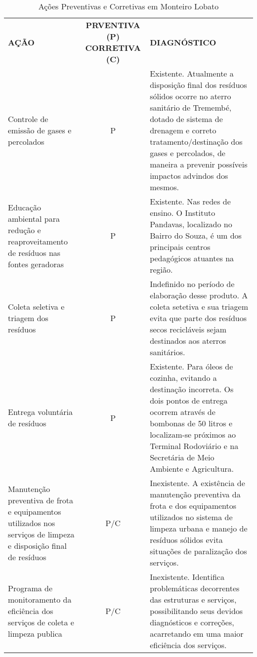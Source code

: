\begin{table}[htbp]
	\centering
	\caption{Ações Preventivas e Corretivas em Monteiro Lobato}
	\begin{tabular}{p{23.455em}cp{27.725em}}
		\rowcolor[rgb]{ .969,  .588,  .275} \textcolor[rgb]{ 1,  1,  1}{\textbf{AÇÃO}} & \multicolumn{1}{p{7.91em}}{\textcolor[rgb]{ 1,  1,  1}{\textbf{PRVENTIVA (P) CORRETIVA (C)}}} & \textcolor[rgb]{ 1,  1,  1}{\textbf{DIAGNÓSTICO}} \\
		\rowcolor[rgb]{ .984,  .831,  .706} Controle de emissão de gases e percolados & P     & Existente. Atualmente a disposição final dos resíduos sólidos ocorre no aterro sanitário de Tremembé, dotado de sistema de drenagem e correto tratamento/destinação dos gases e percolados, de maneira a prevenir possíveis impactos advindos dos mesmos. \\
		\rowcolor[rgb]{ .992,  .914,  .851} Educação ambiental para redução e reaproveitamento de resíduos nas fontes geradoras & P     & Existente. Nas redes de ensino. O Instituto Pandavas, localizado no Bairro do Souza, é um dos principais centros pedagógicos atuantes na região. \\
		\rowcolor[rgb]{ .984,  .831,  .706} Coleta seletiva e triagem dos resíduos & P     & Indefinido no período de elaboração desse produto. A coleta setetiva e sua triagem evita que parte dos resíduos secos recicláveis sejam destinados aos aterros sanitários. \\
		\rowcolor[rgb]{ .992,  .914,  .851} Entrega voluntária de resíduos & P     & Existente. Para óleos de cozinha, evitando a destinação incorreta. Os dois pontos de entrega ocorrem através de bombonas de 50 litros e localizam-se próximos ao Terminal Rodoviário e na Secretária de Meio Ambiente e Agricultura. \\
		\rowcolor[rgb]{ .984,  .831,  .706} Manutenção preventiva de frota e equipamentos utilizados nos serviços de limpeza e disposição final de resíduos & \multicolumn{1}{p{7.91em}}{P/C} & Inexistente. A existência de manutenção preventiva da frota e dos equipamentos utilizados no sistema de limpeza urbana e manejo de resíduos sólidos evita situações de paralização dos serviços. \\
		\rowcolor[rgb]{ .992,  .914,  .851} Programa de monitoramento da eficiência dos serviços de coleta e limpeza publica & P/C   & Inexistente. Identifica problemáticas decorrentes das estruturas e serviços, possibilitando seus devidos diagnósticos e correções, acarretando em uma maior eficiência dos serviços. \\

\end{tabular}
\end{table}
